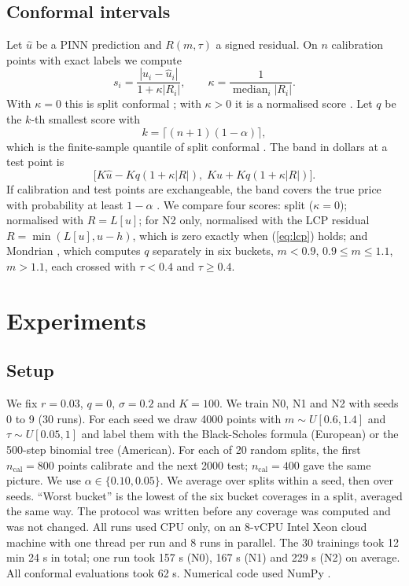 \documentclass[conference]{IEEEtran}
\DeclareMathOperator*{\median}{median}
\begin{document}
\subsection{Conformal intervals}
Let $\hat u$ be a PINN prediction and $R(m,\tau)$ a signed residual. On $n$ calibration points with exact labels we compute
\begin{equation}
s_i=\frac{|u_i-\hat u_i|}{1+\kappa|R_i|},\qquad \kappa=\frac{1}{\median_i|R_i|}. \label{eq:score}
\end{equation}
With $\kappa=0$ this is split conformal \cite{papadopoulos2002inductive}; with $\kappa>0$ it is a normalised score \cite{papadopoulos2011regression}. Let $q$ be the $k$-th smallest score with
\begin{equation}
k=\lceil (n+1)(1-\alpha)\rceil , \label{eq:k}
\end{equation}
which is the finite-sample quantile of split conformal \cite{lei2018distribution}. The band in dollars at a test point is
\begin{equation}
\big[K\hat u-Kq(1+\kappa|R|),\;K\hat u+Kq(1+\kappa|R|)\big]. \label{eq:band}
\end{equation}
If calibration and test points are exchangeable, the band covers the true price with probability at least $1-\alpha$ \cite{lei2018distribution}. We compare four scores: split ($\kappa=0$); normalised with $R=L[u]$; for N2 only, normalised with the LCP residual $R=\min(L[u],u-h)$, which is zero exactly when (\ref{eq:lcp}) holds; and Mondrian \cite{bostrom2020mondrian}, which computes $q$ separately in six buckets, $m<0.9$, $0.9\le m\le1.1$, $m>1.1$, each crossed with $\tau<0.4$ and $\tau\ge0.4$.

\section{Experiments}
\subsection{Setup}
We fix $r=0.03$, $q=0$, $\sigma=0.2$ and $K=100$. We train N0, N1 and N2 with seeds 0 to 9 (30 runs). For each seed we draw 4000 points with $m\sim U[0.6,1.4]$ and $\tau\sim U[0.05,1]$ and label them with the Black-Scholes formula (European) or the 500-step binomial tree (American). For each of 20 random splits, the first $n_{\mathrm{cal}}=800$ points calibrate and the next 2000 test; $n_{\mathrm{cal}}=400$ gave the same picture. We use $\alpha\in\{0.10,0.05\}$. We average over splits within a seed, then over seeds. ``Worst bucket'' is the lowest of the six bucket coverages in a split, averaged the same way. The protocol was written before any coverage was computed and was not changed. All runs used CPU only, on an 8-vCPU Intel Xeon cloud machine with one thread per run and 8 runs in parallel. The 30 trainings took 12 min 24 s in total; one run took 157 s (N0), 167 s (N1) and 229 s (N2) on average. All conformal evaluations took 62 s. Numerical code used NumPy \cite{harris2020array}.
\end{document}
